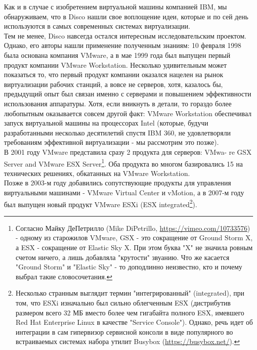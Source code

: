\documentclass[14pt, a4paper]{article}
\begin{document}
Как и в случае с изобретением виртуальной машины компанией IBM, мы
обнаруживаем, что в Disco нашли свое воплощение идеи, которые и по сей день
используются в самых современных системах виртуализации.\\

Тем не менее, Disco навсегда остался интересным исследовательским проектом.
Однако, его авторы нашли применение полученным знаниям: 10 февраля 1998 была
основана компания VMware, а в мае 1999 года был выпущен первый продукт компании
VMware Workstation. Несколько удивительным может показаться то, что первый
продукт компании оказался нацелен на рынок виртуализации рабочих станций, а вовсе
не серверов, хотя, казалось бы, предыдущий опыт был связан именно с серверами и
повышением эффективности использования аппаратуры. Хотя, если вникнуть в
детали, то гораздо более любопытным оказывается совсем другой факт: VMware
Workstation обеспечивал запуск виртуальной машины на процессорах Intel (которые,
будучи разработанными несколько десятилетий спустя IBM 360, не удовлетворяли
требованиям эффективной виртуализации - мы рассмотрим это позже).\\

В 2001 году VMware представила сразу 2 продукта для серверов: VMwa- re GSX Server
and VMware ESX Server\footnote{Согласно Майку ДеПетрилло (Mike DiPetrillo, \href{https://vimeo.com/10733576}{https://vimeo.com/10733576}) - одному из
старожилов VMware, GSX - это сокращение от Ground Storm X, а ESX - сокращение от Elastic
Sky X. При этом буква "X" не значила ровным счетом ничего, а лишь добавляла "крутости"
звуанию. Что же касается "Ground Storm" и "Elastic Sky" - то доподлинно неизвестно, кто и
почему выбрал такие словосочетания.}. Оба продукта во многом базировались 15 на технических
решениях, обкатанных на VMware Workstation.\\

Позже в 2003-м году добавились сопутствующие продукты для управления
виртуальными машинами - VMware Virtual Center и vMotion, а в 2007-м году был
выпущен новый продукт VMware ESXi (ESX integrated\footnote{Несколько странным выглядит термин "интегрированный" (integrated), при том, что ESXi
изначально был сильно облегченным ESX (дистрибутив размером всего 32 МБ вместо более
чем гигабайта полного ESX, имевшего Red Hat Enterprise Linux в качестве "Service Console").
Однако, речь идет об интеграции в сам гипервизор сервисной консоли в виде популярного во
встраиваемых системах набора утилит Busybox (\href{https://busybox.net/}{https://busybox.net/}).}).\\
\end{document}
